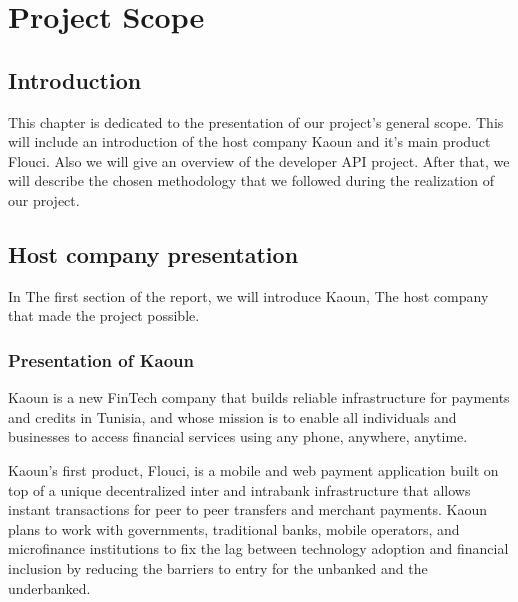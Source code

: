 \setcounter{mtc}{5} %
\chapter{Project Scope}
\minitoc  %

\graphicspath{{Chapitre1/figures/}}
\pagestyle{fancy}
\fancyhf{}
\fancyhead[R]{\bfseries\rightmark}
\fancyfoot[R]{\thepage}
\renewcommand{\headrulewidth}{0.5pt}
\renewcommand{\footrulewidth}{0pt}
\renewcommand{\chaptermark}[1]{\markboth{\MakeUppercase{\chaptername~\thechapter. #1 }}{}}
\renewcommand{\sectionmark}[1]{\markright{\thechapter.\thesection~ #1}}

\begin{spacing}{1.2}

\section*{Introduction}
This chapter is dedicated to the presentation of our project's general scope. 
This will include an introduction of the host company Kaoun and it's main product Flouci. Also we will give an overview of the developer API project. After that, we will describe the chosen methodology that we followed during the realization of our project.
\section{Host company presentation} 
In The first section of the report, we will introduce Kaoun, The host company that made the project possible.
\subsection{Presentation of Kaoun}
Kaoun is a new FinTech company that builds reliable infrastructure for payments and credits in Tunisia, and whose mission is to enable all individuals and businesses to access financial services using any phone, anywhere, anytime. 

Kaoun's first product, Flouci, is a mobile and web payment application built on top of a unique decentralized inter and intrabank infrastructure that allows instant transactions for peer to peer transfers and merchant payments. Kaoun plans to work with governments, traditional banks, mobile operators, and microfinance institutions to fix the lag between technology adoption and financial inclusion by reducing the barriers to entry for the unbanked and the underbanked.



\end{spacing}
